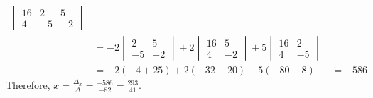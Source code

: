 \documentclass{report}
\begin{document}
{\begin{enumerate}
\[\begin{align*}
\begin{vmatrix}
                                       16  & 2   & 5   \\
                                       4   & - 5 & - 2
                                   \end{vmatrix}                                         \\
                               & = - 2 \begin{vmatrix}
                                           2   & 5   \\
                                           - 5 & - 2
                                       \end{vmatrix} + 2 \begin{vmatrix}
                                                             16 & 5   \\
                                                             4  & - 2
                                                         \end{vmatrix} + 5 \begin{vmatrix}
                                                                               16 & 2   \\
                                                                               4  & - 5
                                                                           \end{vmatrix}\, \\
                               & = - 2( - 4 + 25) + 2( - 32 - 20) + 5( - 80 - 8) & = - 586
                  \end{align*}
              \]
              Therefore, $ x = \frac{\Delta_x}{\Delta} = \frac{- 586}{- 82} = \frac{293}{41}
              $.


\end{enumerate}}
\end{document}
